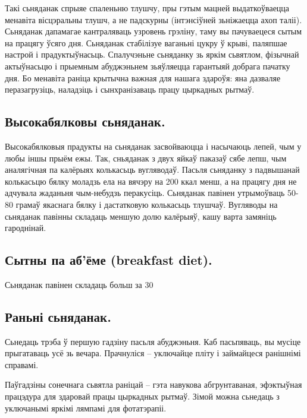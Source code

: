 Такі сьняданак спрыяе спаленьню тлушчу, пры гэтым мацней выдаткоўваецца менавіта вісцэральны тлушч, а не падскурны (інтэнсіўней зьніжаецца ахоп таліі). Сьняданак дапамагае кантраляваць узровень грэліну, таму вы пачуваецеся сытым на працягу ўсяго дня. Сьняданак стабілізуе ваганьні цукру ў крыві, паляпшае настрой і прадуктыўнасьць. Спалучэньне сьняданку зь яркім сьвятлом, фізычнай актыўнасьцю і прыемным абуджэньнем зьяўляецца гарантыяй добрага пачатку дня. Бо менавіта раніца крытычна важная для нашага здароўя: яна дазваляе перазагрузіць, наладзіць і сынхранізаваць працу цыркадных рытмаў.

\subsection{Высокабялковы сьняданак.}
Высокабялковыя прадукты на сьняданак засвойваюцца і насычаюць лепей, чым у любы іншы прыём ежы. Так, сньяданак з двух яйкаў паказаў сябе лепш, чым аналягічная па калёрыях колькасьць вугляводаў. Пасьля сьняданку з падвышанай колькасьцю бялку моладзь ела на вячэру на 200 ккал менш, а на працягу дня не адчувала жаданьня чым-небудзь перакусіць. Сьняданак павінен утрымоўваць 50-80 грамаў якаснага бялку і дастатковую колькасьць тлушчаў. Вугляводы на сьняданак павінны складаць меншую долю калёрыяў, кашу варта замяніць гароднінай.

\subsection{Сытны па аб'ёме (breakfast diet).}
Сьняданак павінен складаць больш за 30%

\subsection{Раньні сьняданак.}
Сьнедаць трэба ў першую гадзіну пасьля абуджэньня. Каб пасьпяваць, вы мусіце прыгатаваць усё зь вечара. Прачнуліся – уключайце пліту і займайцеся ранішнімі справамі.

Паўгадзіны сонечнага сьвятла раніцай – гэта навукова абгрунтаваная, эфэктыўная працэдура для здаровай працы цыркадных рытмаў. Зімой можна сьнедаць з уключанымі яркімі лямпамі для фотатэрапіі.

